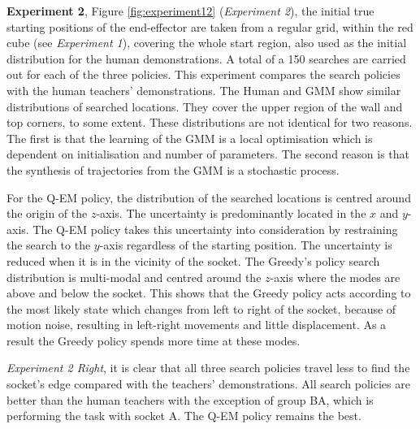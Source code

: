 \documentclass[final,3p,times,twocolumn]{elsarticle}
\begin{document}
\textbf{Experiment 2}, Figure \ref{fig:experiment12} (\textit{Experiment 2}), the initial true starting positions 
of the end-effector are taken from a regular grid, within the red cube (see \textit{Experiment 1}), covering the whole start region, also used as the initial distribution for 
the human demonstrations. A total of a 150 searches are carried out for each of the three policies. 
This experiment compares the search policies with the human teachers' demonstrations. 
The Human and GMM show similar distributions of searched locations. They cover the upper region of the wall and top corners, to some extent. These distributions 
are not identical for two reasons. The first is that the learning of the GMM is a local optimisation 
which is dependent on initialisation and number of parameters. The second reason is that the synthesis of trajectories 
from the GMM is a stochastic process. 

For the  Q-EM policy, the distribution of the searched locations is centred around the origin of the $z$-axis.
The uncertainty is predominantly located in the $x$ and $y$-axis. The Q-EM policy takes this uncertainty 
into consideration by restraining the search to the $y$-axis regardless of the starting position. The uncertainty 
is reduced when it is in the vicinity of the socket. The Greedy's policy search distribution is multi-modal and 
centred around the $z$-axis where the modes are above and below the socket. This shows that the Greedy policy 
acts according to the most likely state which changes from left to right of the socket, because of motion noise, 
resulting in left-right movements and little displacement. As a result the Greedy policy spends more time at these modes.

\textit{Experiment 2 Right}, it is clear that all three search policies travel less to find the socket's edge compared 
with the teachers' demonstrations. All search policies are better than the human teachers with the exception of group BA, 
which is performing the task with socket A. The Q-EM policy remains the best. 
\end{document}
